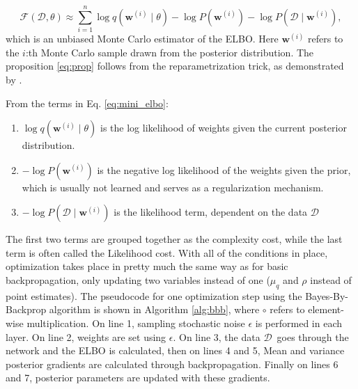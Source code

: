 	\begin{equation}
	\label{eq:mini_elbo}
	\mathcal{F}(\mathcal{D}, \theta) \approx \sum_{i=1}^{n}\log q(\pmb{w}^{(i)}\mid\theta) - \log P(\pmb{w}^{(i)}) - \log P(\mathcal{D}\mid\pmb{w}^{(i)}),
	\end{equation}
	which is an unbiased Monte Carlo estimator of the ELBO. Here $\pmb{w}^{(i)}$ refers to the $i$:th Monte Carlo sample drawn from the posterior distribution. The proposition \eqref{eq:prop} follows from the reparametrization trick, as demonstrated by \citet{blundell_weight_2015}.
	
	From the terms in Eq. \eqref{eq:mini_elbo}:
	\begin{enumerate}
		\item $\log q(\pmb{w}^{(i)} \mid \theta)$ is the log likelihood of weights given the current posterior distribution.
		
		\item $-\log P(\pmb{w}^{(i)})$ is the negative log likelihood of the weights given the prior, which is usually not learned and serves as a regularization mechanism. 
		
		\item $- \log P(\mathcal{D} \mid \pmb{w}^{(i)})$ is the likelihood term, dependent on the data $\mathcal{D}$
	\end{enumerate}
	
	\vspace*{2mm}
	The first two terms are grouped together as the complexity cost, while the last term is often called the Likelihood cost. With all of the conditions in place, optimization takes place in pretty much the same way as for basic backpropagation, only updating two variables instead of one ($\mu_q$ and $\rho$ instead of point estimates). The pseudocode for one optimization step using the Bayes-By-Backprop algorithm is shown in Algorithm \ref{alg:bbb}, where $\circ$ refers to element-wise multiplication. On line 1, sampling stochastic noise $\epsilon$ is performed in each layer. On line 2, weights are set using $\epsilon$. On line 3, the data $\mathcal{D}$ goes through the network and the ELBO is calculated, then on lines 4 and 5, Mean and variance posterior gradients are calculated through backpropagation. Finally on lines 6 and 7, posterior parameters are updated with these gradients.
	
